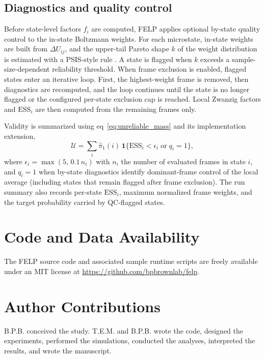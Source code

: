 \documentclass[journal=jctcce,manuscript=article,layout=twocolumn,hyperref=true]{achemso}
\newcommand{\eqnref}[1]{eq~\ref{#1}}
\begin{document}
	\subsection{Diagnostics and quality control}
		
	Before state-level factors $f_i$ are computed, FELP applies optional by-state quality control to the in-state Boltzmann weights. For each microstate, in-state weights are built from $\Delta U_{ij}$, and the upper-tail Pareto shape $k$ of the weight distribution is estimated with a PSIS-style rule \cite{vehtari2024psis}. A state is flagged when $k$ exceeds a sample-size-dependent reliability threshold. When frame exclusion is enabled, flagged states enter an iterative loop. First, the highest-weight frame is removed, then diagnostics are recomputed, and the loop continues until the state is no longer flagged or the configured per-state exclusion cap is reached. Local Zwanzig factors and $\mathrm{ESS}_i$ are then computed from the remaining frames only.
	
	Validity is summarized using \eqnref{eq:unreliable_mass} and its implementation extension,
	\begin{equation}
		\mathcal{U} =
		\sum_i \hat{\pi}_1(i)\,
		\mathbf{1}\{\mathrm{ESS}_i < \epsilon_i \; \mathrm{or}\; q_i = 1\},
	\end{equation}
	where $\epsilon_i=\max(5,\,0.1\,n_i)$ with $n_i$ the number of evaluated frames in state $i$, and $q_i=1$ when by-state diagnostics identify dominant-frame control of the local average (including states that remain flagged after frame exclusion). The run summary also records per-state $\mathrm{ESS}_i$, maximum normalized frame weights, and the target probability carried by QC-flagged states.
	
	\section{Code and Data Availability}
	
	The FELP source code and associated sample runtime scripts are freely available under an MIT license at \url{https://github.com/bpbrownlab/felp}.
	
	\section{Author Contributions}
	
	B.P.B. conceived the study. T.E.M. and B.P.B. wrote the code, designed the experiments, performed the simulations, conducted the analyses, interpreted the results, and wrote the manuscript.
	
\end{document}

